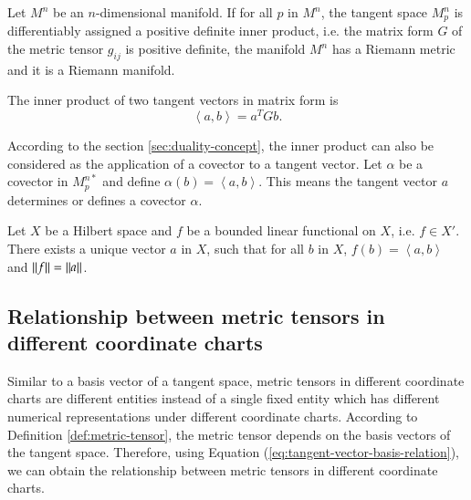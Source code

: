 \documentclass[11pt, a4paper]{book}
\begin{document}
\begin{Definition}
  Let $M^n$ be an $n$-dimensional manifold. If for all $p$ in $M^n$, the tangent space
  $M_p^n$ is differentiably assigned a positive definite inner product, i.e. the matrix
  form $G$ of the metric tensor $g_{ij}$ is positive definite, the manifold $M^n$ has a
  Riemann metric and it is a Riemann manifold.
\end{Definition}

The inner product of two tangent vectors in matrix form is
\begin{equation}
  \left\langle a,b \right\rangle = a^T G b.
\end{equation}

According to the section \ref{sec:duality-concept}, the inner product can also be
considered as the application of a covector to a tangent vector. Let $\alpha$ be a
covector in $M_p^{n*}$ and define $\alpha(b) = \left\langle a, b \right\rangle$. This
means the tangent vector $a$ determines or defines a covector $\alpha$.

\begin{Theorem}
  Let $X$ be a Hilbert space and $f$ be a bounded linear functional on $X$, i.e.
  $f \in X'$. There exists a unique vector $a$ in $X$, such that for all $b$ in $X$,
  $f(b) = \left\langle a, b \right\rangle$ and $\lVert f\rVert = \lVert a\rVert$.
\end{Theorem}

\subsection{Relationship between metric tensors in different coordinate charts}

Similar to a basis vector of a tangent space, metric tensors in different coordinate
charts are different entities instead of a single fixed entity which has different
numerical representations under different coordinate charts. According to Definition
\ref{def:metric-tensor}, the metric tensor depends on the basis vectors of the tangent
space. Therefore, using Equation (\ref{eq:tangent-vector-basis-relation}), we can obtain
the relationship between metric tensors in different coordinate charts.
\end{document}
